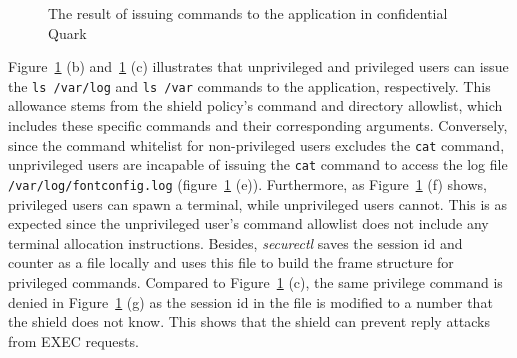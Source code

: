 \begin{figure}[!b]

  
  \caption[The result of issuing commands to the application in confidential Quark]{The result of issuing  commands to the application in confidential Quark\label{fig:exec}}
  \label{fig:cquark_cmd_exec}

\end{figure}
Figure~\ref{fig:cquark_cmd_exec} (b) and~\ref{fig:cquark_cmd_exec} (c) illustrates that unprivileged and privileged users can issue the \texttt{ls /var/log} and \texttt{ls /var}  commands to the application, respectively. 
This allowance stems from the shield policy's command and directory allowlist, which includes these specific commands and their corresponding arguments. Conversely, since the command whitelist for non-privileged users excludes the \texttt{cat} command, unprivileged users are incapable of issuing the \texttt{cat} command to 
access the log file \texttt{/var/log/fontconfig.log} (figure~\ref{fig:cquark_cmd_exec} (e)). Furthermore, as Figure~\ref{fig:cquark_cmd_exec} (f) shows, privileged users can spawn a terminal, while unprivileged users cannot. 
This is as expected since the unprivileged user's command allowlist does not include any terminal allocation instructions. Besides, \emph{securectl} saves the session id and counter as a file locally and uses this file to build the frame structure for privileged commands. Compared to Figure~\ref{fig:cquark_cmd_exec} (c), the same 
privilege command is denied in Figure~\ref{fig:cquark_cmd_exec} (g) as the session id in the file is modified to a number that the shield does not know. This shows that the shield can prevent reply attacks from EXEC requests. 




